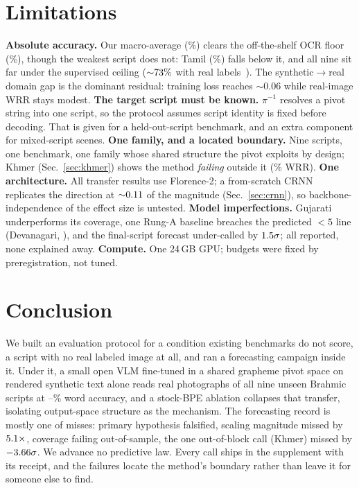 \section{Limitations}
\label{sec:limitations}

\textbf{Absolute accuracy.} Our macro-average (\wrrBmean\%) clears the off-the-shelf OCR floor
(\tessMean\%), though the weakest script does not: Tamil (\wrrBtamil\%) falls below it, and all
nine sit far under the supervised ceiling (${\sim}73\%$ with real labels~\cite{bstd}). The
synthetic$\rightarrow$real domain gap is the dominant residual: training loss reaches ${\sim}0.06$
while real-image WRR stays modest. \textbf{The target script must be known.} $\pi^{-1}$ resolves a
pivot string into one script, so the protocol assumes script identity is fixed before decoding.
That is given for a held-out-script benchmark, and an extra component for mixed-script scenes.
\textbf{One family, and a located boundary.} Nine scripts, one benchmark, one family whose shared
structure the pivot exploits by design; Khmer (Sec.~\ref{sec:khmer}) shows the method
\emph{failing} outside it (\khmerB\% WRR). \textbf{One architecture.} All transfer results use
Florence-2; a from-scratch CRNN replicates the direction at ${\sim}0.11$ of the
magnitude (Sec.~\ref{sec:crnn}), so backbone-independence of the effect size is untested.
\textbf{Model imperfections.} Gujarati underperforms its coverage, one Rung-A baseline breaches
the predicted $<5$ line (Devanagari, \wrrAdevanagari), and the final-script forecast
under-called by $1.5\sigma$; all reported, none explained away. \textbf{Compute.} One
24\,GB GPU; budgets were fixed by preregistration, not tuned.

\section{Conclusion}
\label{sec:conclusion}

We built an evaluation protocol for a condition existing benchmarks do not score, a script with
no real labeled image at all, and ran a forecasting campaign inside it. Under it, a small open
VLM fine-tuned in a shared grapheme pivot space on rendered synthetic text alone reads real
photographs of all nine unseen Brahmic scripts at \wrrBmin--\wrrBmax\% word accuracy, and a
stock-BPE ablation collapses that transfer, isolating output-space structure as the mechanism. The
forecasting record is mostly one of misses: primary hypothesis falsified, scaling magnitude
missed by $5.1\times$, coverage failing out-of-sample, the one out-of-block call
(Khmer) missed by $-3.66\sigma$. We advance no predictive law. Every call ships in the
supplement with its receipt, and the failures locate the method's boundary rather than leave it
for someone else to find.

